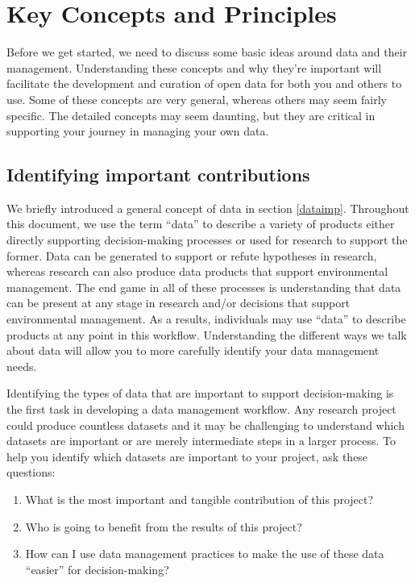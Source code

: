 \documentclass[
]{book}
\providecommand{\tightlist}{%
  \setlength{\itemsep}{0pt}\setlength{\parskip}{0pt}}
\begin{document}
\hypertarget{keys}{%
\chapter{Key Concepts and Principles}\label{keys}}

Before we get started, we need to discuss some basic ideas around data and their management. Understanding these concepts and why they're important will facilitate the development and curation of open data for both you and others to use. Some of these concepts are very general, whereas others may seem fairly specific. The detailed concepts may seem daunting, but they are critical in supporting your journey in managing your own data.

\hypertarget{contribs}{%
\section{Identifying important contributions}\label{contribs}}

We briefly introduced a general concept of data in section \ref{dataimp}. Throughout this document, we use the term ``data'' to describe a variety of products either directly supporting decision-making processes or used for research to support the former. Data can be generated to support or refute hypotheses in research, whereas research can also produce data products that support environmental management. The end game in all of these processes is understanding that data can be present at any stage in research and/or decisions that support environmental management. As a results, individuals may use ``data'' to describe products at any point in this workflow. Understanding the different ways we talk about data will allow you to more carefully identify your data management needs.

Identifying the types of data that are important to support decision-making is the first task in developing a data management workflow. Any research project could produce countless datasets and it may be challenging to understand which datasets are important or are merely intermediate steps in a larger process. To help you identify which datasets are important to your project, ask these questions:

\begin{enumerate}
\def\labelenumi{\arabic{enumi}.}
\tightlist
\item
  What is the most important and tangible contribution of this project?\\
\item
  Who is going to benefit from the results of this project?
\item
  How can I use data management practices to make the use of these data ``easier'' for decision-making?
\end{enumerate}
\end{document}
